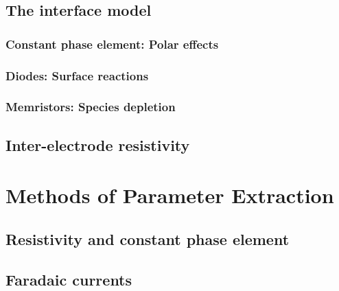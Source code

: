   \subsection{The interface model}
    \subsubsection{Constant phase element: Polar effects}
    \subsubsection{Diodes: Surface reactions}
    \subsubsection{Memristors: Species depletion}

  \subsection{Inter-electrode resistivity}




\section{Methods of Parameter Extraction}
  \subsection{Resistivity and constant phase element}
  \subsection{Faradaic currents}


